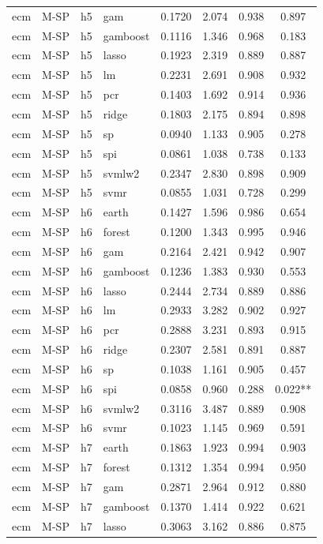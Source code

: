 \begin{ThreePartTable}
\begin{longtable}[t]{llclcccc}
ecm & M-SP & h5 & gam & 0.1720 & 2.074 & 0.938 & 0.897\\
ecm & M-SP & h5 & gamboost & 0.1116 & 1.346 & 0.968 & 0.183\\
ecm & M-SP & h5 & lasso & 0.1923 & 2.319 & 0.889 & 0.887\\
ecm & M-SP & h5 & lm & 0.2231 & 2.691 & 0.908 & 0.932\\
ecm & M-SP & h5 & pcr & 0.1403 & 1.692 & 0.914 & 0.936\\
ecm & M-SP & h5 & ridge & 0.1803 & 2.175 & 0.894 & 0.898\\
ecm & M-SP & h5 & sp & 0.0940 & 1.133 & 0.905 & 0.278\\
ecm & M-SP & h5 & spi & 0.0861 & 1.038 & 0.738 & 0.133\\
ecm & M-SP & h5 & svmlw2 & 0.2347 & 2.830 & 0.898 & 0.909\\
ecm & M-SP & h5 & svmr & 0.0855 & 1.031 & 0.728 & 0.299\\
\addlinespace
ecm & M-SP & h6 & earth & 0.1427 & 1.596 & 0.986 & 0.654\\
ecm & M-SP & h6 & forest & 0.1200 & 1.343 & 0.995 & 0.946\\
ecm & M-SP & h6 & gam & 0.2164 & 2.421 & 0.942 & 0.907\\
ecm & M-SP & h6 & gamboost & 0.1236 & 1.383 & 0.930 & 0.553\\
ecm & M-SP & h6 & lasso & 0.2444 & 2.734 & 0.889 & 0.886\\
ecm & M-SP & h6 & lm & 0.2933 & 3.282 & 0.902 & 0.927\\
ecm & M-SP & h6 & pcr & 0.2888 & 3.231 & 0.893 & 0.915\\
ecm & M-SP & h6 & ridge & 0.2307 & 2.581 & 0.891 & 0.887\\
ecm & M-SP & h6 & sp & 0.1038 & 1.161 & 0.905 & 0.457\\
ecm & M-SP & h6 & spi & 0.0858 & 0.960 & 0.288 & 0.022**\\
ecm & M-SP & h6 & svmlw2 & 0.3116 & 3.487 & 0.889 & 0.908\\
ecm & M-SP & h6 & svmr & 0.1023 & 1.145 & 0.969 & 0.591\\
\addlinespace
ecm & M-SP & h7 & earth & 0.1863 & 1.923 & 0.994 & 0.903\\
ecm & M-SP & h7 & forest & 0.1312 & 1.354 & 0.994 & 0.950\\
ecm & M-SP & h7 & gam & 0.2871 & 2.964 & 0.912 & 0.880\\
ecm & M-SP & h7 & gamboost & 0.1370 & 1.414 & 0.922 & 0.621\\
ecm & M-SP & h7 & lasso & 0.3063 & 3.162 & 0.886 & 0.875\\

\end{longtable}
\end{ThreePartTable}
